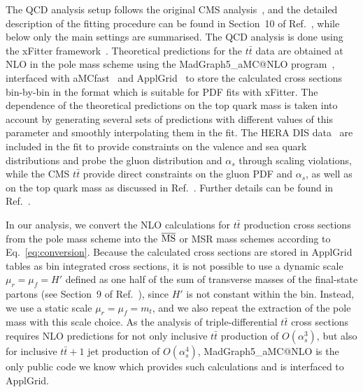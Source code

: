 \documentclass[12pt,a4paper]{article}
\newcommand{\msbar}{\ensuremath{\overline{\rm MS}}\xspace}
\begin{document}
The QCD analysis setup follows the original CMS analysis~\cite{Sirunyan:2019zvx}, and the detailed description of the fitting procedure can be found in Section~10 of Ref.~\cite{Sirunyan:2019zvx}, while below only the main settings are summarised. The QCD analysis is done using the xFitter framework~\cite{Alekhin:2014irh}. Theoretical predictions for the $t\bar{t}$ data are obtained at NLO in the pole mass scheme using the MadGraph5\_aMC@NLO program~\cite{Alwall:2014hca}, interfaced with aMCfast~\cite{Bertone:2014zva} and ApplGrid~\cite{Carli:2010rw} to store the calculated cross sections bin-by-bin in the format which is suitable for PDF fits with xFitter. The dependence of the theoretical predictions on the top quark mass is taken into account by generating several sets of predictions with different values of this parameter and smoothly interpolating them in the fit. The HERA DIS data~\cite{Abramowicz:2015mha} are included in the fit to provide constraints on the valence and sea quark distributions and probe the gluon distribution and $\alpha_s$ through scaling violations, while the CMS $t\bar{t}$ provide direct constraints on the gluon PDF and $\alpha_s$, as well as on the top quark mass as discussed in Ref.~\cite{Sirunyan:2019zvx}. Further details can be found in Ref.~\cite{Sirunyan:2019zvx}.

In our analysis, we convert the NLO calculations for $t\bar{t}$ production cross sections from the pole mass scheme into the \msbar or MSR mass schemes according to Eq.~\ref{eq:conversion}. Because the calculated cross sections are stored in ApplGrid tables as bin integrated cross sections, it is not possible to use a dynamic scale $\mu_r = \mu_f = H'$ defined as one half of the sum of transverse masses of the final-state partons (see Section~9 of Ref.~\cite{Sirunyan:2019zvx}), since $H'$ is not constant within the bin. Instead, we use a static scale $\mu_r = \mu_f = m_t$, and we also repeat the extraction of the pole mass with this scale choice.
As the analysis of triple-differential $t\bar{t}$ cross sections requires NLO predictions for not only inclusive $t\bar{t}$ production of $O(\alpha_s^3)$, but also for inclusive $t\bar{t}+1$ jet production of $O(\alpha_s^4)$, MadGraph5\_aMC@NLO is the only public code we know which provides such calculations and is interfaced to ApplGrid.
\end{document}
